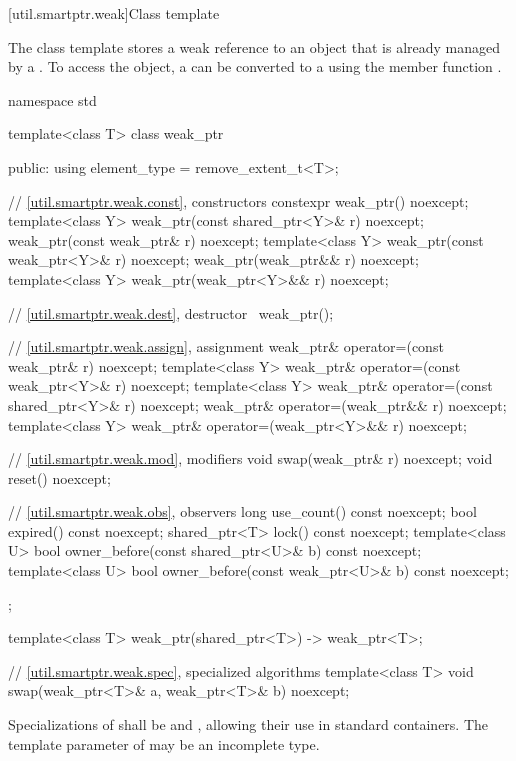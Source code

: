 [util.smartptr.weak]{Class template }

\pnum
{}%
The  class template stores a weak reference to an object
that is already managed by a . To access the object, a
 can be converted to a  using the member
function .

\begin{codeblock}
namespace std {
  template<class T> class weak_ptr {
  public:
    using element_type = remove_extent_t<T>;

    // \ref{util.smartptr.weak.const}, constructors
    constexpr weak_ptr() noexcept;
    template<class Y>
      weak_ptr(const shared_ptr<Y>& r) noexcept;
    weak_ptr(const weak_ptr& r) noexcept;
    template<class Y>
      weak_ptr(const weak_ptr<Y>& r) noexcept;
    weak_ptr(weak_ptr&& r) noexcept;
    template<class Y>
      weak_ptr(weak_ptr<Y>&& r) noexcept;

    // \ref{util.smartptr.weak.dest}, destructor
    ~weak_ptr();

    // \ref{util.smartptr.weak.assign}, assignment
    weak_ptr& operator=(const weak_ptr& r) noexcept;
    template<class Y>
      weak_ptr& operator=(const weak_ptr<Y>& r) noexcept;
    template<class Y>
      weak_ptr& operator=(const shared_ptr<Y>& r) noexcept;
    weak_ptr& operator=(weak_ptr&& r) noexcept;
    template<class Y>
      weak_ptr& operator=(weak_ptr<Y>&& r) noexcept;

    // \ref{util.smartptr.weak.mod}, modifiers
    void swap(weak_ptr& r) noexcept;
    void reset() noexcept;

    // \ref{util.smartptr.weak.obs}, observers
    long use_count() const noexcept;
    bool expired() const noexcept;
    shared_ptr<T> lock() const noexcept;
    template<class U>
      bool owner_before(const shared_ptr<U>& b) const noexcept;
    template<class U>
      bool owner_before(const weak_ptr<U>& b) const noexcept;
  };

  template<class T>
    weak_ptr(shared_ptr<T>) -> weak_ptr<T>;

  // \ref{util.smartptr.weak.spec}, specialized algorithms
  template<class T>
    void swap(weak_ptr<T>& a, weak_ptr<T>& b) noexcept;
}
\end{codeblock}

\pnum
Specializations of  shall be  and
, allowing their use in standard
containers.  The template parameter  of  may be an
incomplete type.

